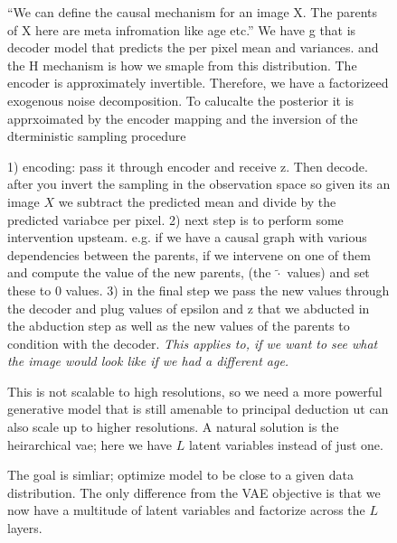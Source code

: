 \documentclass[11pt]{article}
\begin{document}
\begin{figure}[H]
    \centering
    \caption{``We can define the causal mechanism for an image X. The parents of X here are meta infromation like age etc.'' We have g that is decoder model that predicts the per pixel mean and variances. and the H mechanism is how we smaple from this distribution. The encoder is approximately invertible. Therefore, we have a factorizeed exogenous noise decomposition. To calucalte the posterior it is apprxoimated by the encoder mapping and the inversion of the dterministic sampling procedure}
\end{figure}

\begin{figure}[H]
    \centering
    \caption{1) encoding: pass it through encoder and receive z. Then decode. after you invert the sampling in the observation space so given its an image $X$ we subtract the predicted mean and divide by the predicted variabce per pixel. 2) next step is to perform some intervention upsteam. e.g. if we have a causal graph with various dependencies between the parents, if we intervene on one of them and compute the value of the new parents, (the $\tilde{\cdot}$ values) and set these to 0 values. 3) in the final step we pass the new values through the decoder and plug values of epsilon and z  that we abducted in the abduction step as well as the new values of the parents to condition with the decoder. \emph{This applies to, if we want to see what the image would look like if we had a different age.}}
\end{figure}

\begin{figure}[H]
    \centering
    \caption{This is not scalable to high resolutions, so we need a more powerful generative model that is still amenable to principal deduction ut can also scale up to higher resolutions. A natural solution is the heirarchical vae; here we have $L$ latent variables instead of just one.}
\end{figure}

\begin{figure}[H]
    \centering
    \caption{The goal is simliar; optimize model to be close to a given data distribution. The only difference from the VAE objective is that we now have a multitude of latent variables and factorize across the $L$ layers.}
\end{figure}
\end{document}
